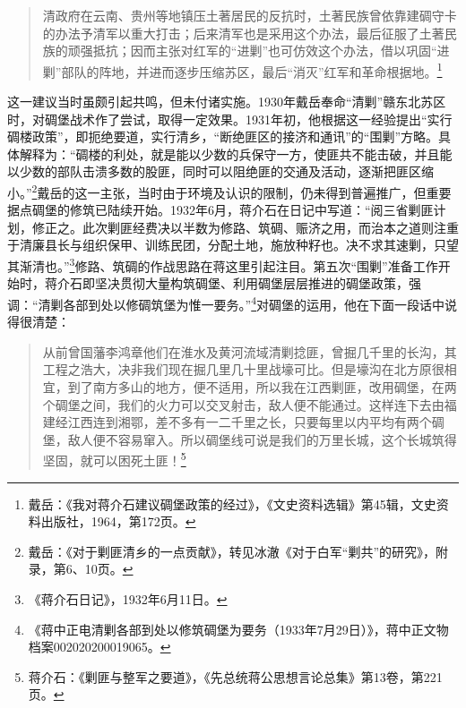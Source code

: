 \begin{quote}

清政府在云南、贵州等地镇压土著居民的反抗时，土著民族曾依靠建碉守卡的办法予清军以重大打击；后来清军也是采用这个办法，最后征服了土著民族的顽强抵抗；因而主张对红军的“进剿”也可仿效这个办法，借以巩固“进剿”部队的阵地，并进而逐步压缩苏区，最后“消灭”红军和革命根据地。\footnote{戴岳：《我对蒋介石建议碉堡政策的经过》，《文史资料选辑》第45辑，文史资料出版社，1964，第172页。}
\end{quote}


这一建议当时虽颇引起共鸣，但未付诸实施。1930年戴岳奉命“清剿”赣东北苏区时，对碉堡战术作了尝试，取得一定效果。1931年初，他根据这一经验提出“实行碉楼政策”，即扼绝要道，实行清乡，“断绝匪区的接济和通讯”的“围剿”方略。具体解释为：“碉楼的利处，就是能以少数的兵保守一方，使匪共不能击破，并且能以少数的部队击溃多数的股匪，同时可以阻绝匪的交通及活动，逐渐把匪区缩小。”\footnote{戴岳：《对于剿匪清乡的一点贡献》，转见冰澈《对于白军“剿共”的研究》，附录，第6、10页。}戴岳的这一主张，当时由于环境及认识的限制，仍未得到普遍推广，但重要据点碉堡的修筑已陆续开始。1932年6月，蒋介石在日记中写道：“阅三省剿匪计划，修正之。此次剿匪经费决以半数为修路、筑碉、赈济之用，而治本之道则注重于清廉县长与组织保甲、训练民团，分配土地，施放种籽也。决不求其速剿，只望其渐清也。”\footnote{《蒋介石日记》，1932年6月11日。}修路、筑碉的作战思路在蒋这里引起注目。第五次“围剿”准备工作开始时，蒋介石即坚决贯彻大量构筑碉堡、利用碉堡层层推进的碉堡政策，强调：“清剿各部到处以修碉筑堡为惟一要务。”\footnote{《蒋中正电清剿各部到处以修筑碉堡为要务（1933年7月29日）》，蒋中正文物档案002020200019065。}对碉堡的运用，他在下面一段话中说得很清楚：

\begin{quote}

从前曾国藩李鸿章他们在淮水及黄河流域清剿捻匪，曾掘几千里的长沟，其工程之浩大，决非我们现在掘几里几十里战壕可比。但是壕沟在北方原很相宜，到了南方多山的地方，便不适用，所以我在江西剿匪，改用碉堡，在两个碉堡之间，我们的火力可以交叉射击，敌人便不能通过。这样连下去由福建经江西连到湘鄂，差不多有一二千里之长，只要每里以内平均有两个碉堡，敌人便不容易窜入。所以碉堡线可说是我们的万里长城，这个长城筑得坚固，就可以困死土匪！\footnote{蒋介石：《剿匪与整军之要道》，《先总统蒋公思想言论总集》第13卷，第221页。}
\end{quote}


